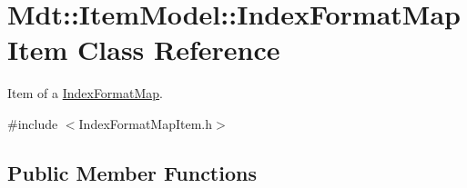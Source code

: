 \hypertarget{class_mdt_1_1_item_model_1_1_index_format_map_item}{}\section{Mdt\+:\+:Item\+Model\+:\+:Index\+Format\+Map\+Item Class Reference}
\label{class_mdt_1_1_item_model_1_1_index_format_map_item}


Item of a \hyperlink{class_mdt_1_1_item_model_1_1_index_format_map}{Index\+Format\+Map}.  




{\ttfamily \#include $<$Index\+Format\+Map\+Item.\+h$>$}

\subsection*{Public Member Functions}
